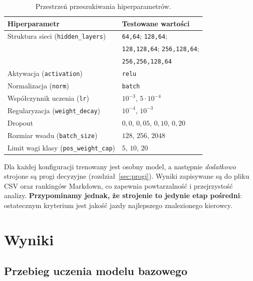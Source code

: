 \documentclass[11pt,a4paper]{article}
\begin{document}
\begin{table}[H]
  \centering
  \caption{Przestrzeń przeszukiwania hiperparametrów.}
  \label{tab:grid}
  \begin{tabular}{ll}
    \toprule
    \textbf{Hiperparametr} & \textbf{Testowane wartości} \\
    \midrule
    Struktura sieci (\texttt{hidden\_layers}) & \texttt{64,64}; \texttt{128,64}; \\
                                              & \texttt{128,128,64}; \texttt{256,128,64}; \\
                                              & \texttt{256,256,128,64} \\
    Aktywacja (\texttt{activation})           & \texttt{relu} \\
    Normalizacja (\texttt{norm})              & \texttt{batch} \\
    Współczynnik uczenia (\texttt{lr})        & $10^{-3}$, $5\cdot10^{-4}$ \\
    Regularyzacja (\texttt{weight\_decay})    & $10^{-4}$, $10^{-3}$ \\
    Dropout                                    & $0{,}0$, $0{,}05$, $0{,}10$, $0{,}20$ \\
    Rozmiar wsadu (\texttt{batch\_size})      & $128$, $256$, $2048$ \\
    Limit wagi klasy (\texttt{pos\_weight\_cap}) & $5$, $10$, $20$ \\
    \bottomrule
  \end{tabular}
\end{table}

Dla każdej konfiguracji trenowany jest osobny model, a następnie \emph{dodatkowo}
strojone są progi decyzyjne (rozdział~\ref{sec:progi}). Wyniki zapisywane są do
pliku CSV oraz rankingów Markdown, co zapewnia powtarzalność i przejrzystość
analizy. \textbf{Przypominamy jednak, że strojenie to jedynie etap pośredni}:
ostatecznym kryterium jest jakość jazdy najlepszego znalezionego kierowcy.

\section{Wyniki}
\label{sec:wyniki}

\subsection{Przebieg uczenia modelu bazowego}
\end{document}
